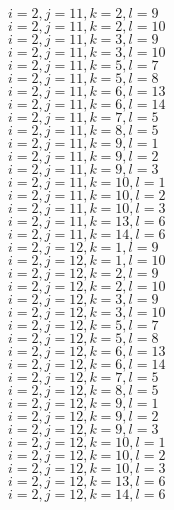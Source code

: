 \documentclass[14pt]{article}
\begin{document}
    $i=2,j=11,k=2,l=9 $ \\ 
    $i=2,j=11,k=2,l=10 $ \\ 
    $i=2,j=11,k=3,l=9 $ \\ 
    $i=2,j=11,k=3,l=10 $ \\ 
    $i=2,j=11,k=5,l=7 $ \\ 
    $i=2,j=11,k=5,l=8 $ \\ 
    $i=2,j=11,k=6,l=13 $ \\ 
    $i=2,j=11,k=6,l=14 $ \\ 
    $i=2,j=11,k=7,l=5 $ \\ 
    $i=2,j=11,k=8,l=5 $ \\ 
    $i=2,j=11,k=9,l=1 $ \\ 
    $i=2,j=11,k=9,l=2 $ \\ 
    $i=2,j=11,k=9,l=3 $ \\ 
    $i=2,j=11,k=10,l=1 $ \\ 
    $i=2,j=11,k=10,l=2 $ \\ 
    $i=2,j=11,k=10,l=3 $ \\ 
    $i=2,j=11,k=13,l=6 $ \\ 
    $i=2,j=11,k=14,l=6 $ \\ 
    $i=2,j=12,k=1,l=9 $ \\ 
    $i=2,j=12,k=1,l=10 $ \\ 
    $i=2,j=12,k=2,l=9 $ \\ 
    $i=2,j=12,k=2,l=10 $ \\ 
    $i=2,j=12,k=3,l=9 $ \\ 
    $i=2,j=12,k=3,l=10 $ \\ 
    $i=2,j=12,k=5,l=7 $ \\ 
    $i=2,j=12,k=5,l=8 $ \\ 
    $i=2,j=12,k=6,l=13 $ \\ 
    $i=2,j=12,k=6,l=14 $ \\ 
    $i=2,j=12,k=7,l=5 $ \\ 
    $i=2,j=12,k=8,l=5 $ \\ 
    $i=2,j=12,k=9,l=1 $ \\ 
    $i=2,j=12,k=9,l=2 $ \\ 
    $i=2,j=12,k=9,l=3 $ \\ 
    $i=2,j=12,k=10,l=1 $ \\ 
    $i=2,j=12,k=10,l=2 $ \\ 
    $i=2,j=12,k=10,l=3 $ \\ 
    $i=2,j=12,k=13,l=6 $ \\ 
    $i=2,j=12,k=14,l=6 $ \\ 
\end{document}
